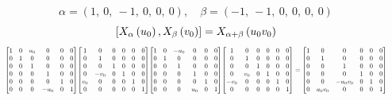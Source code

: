 \documentclass[11pt]{article}
\theoremstyle{definition}
\begin{document}
\[
\alpha = \left( 1, \  0, \  -1, \  0, \  0, \  0\right), \quad \beta = \left( -1, \  -1, \  0, \  0, \  0, \  0\right)
\]
\[
\scaletoalign{\textwidth}{\left[ X_{\alpha}\left(u_{0}\right), X_{\beta}\left(v_{0}\right) \right] = X_{\alpha + \beta}\left(u_{0} v_{0}\right)}
\]
\[
\scaletoalign{\textwidth}{{\left[\begin{matrix}1 & 0 & u_{0} & 0 & 0 & 0\\0 & 1 & 0 & 0 & 0 & 0\\0 & 0 & 1 & 0 & 0 & 0\\0 & 0 & 0 & 1 & 0 & 0\\0 & 0 & 0 & 0 & 1 & 0\\0 & 0 & 0 & - u_{0} & 0 & 1\end{matrix}\right]} {\left[\begin{matrix}1 & 0 & 0 & 0 & 0 & 0\\0 & 1 & 0 & 0 & 0 & 0\\0 & 0 & 1 & 0 & 0 & 0\\0 & - v_{0} & 0 & 1 & 0 & 0\\v_{0} & 0 & 0 & 0 & 1 & 0\\0 & 0 & 0 & 0 & 0 & 1\end{matrix}\right]} {\left[\begin{matrix}1 & 0 & - u_{0} & 0 & 0 & 0\\0 & 1 & 0 & 0 & 0 & 0\\0 & 0 & 1 & 0 & 0 & 0\\0 & 0 & 0 & 1 & 0 & 0\\0 & 0 & 0 & 0 & 1 & 0\\0 & 0 & 0 & u_{0} & 0 & 1\end{matrix}\right]} {\left[\begin{matrix}1 & 0 & 0 & 0 & 0 & 0\\0 & 1 & 0 & 0 & 0 & 0\\0 & 0 & 1 & 0 & 0 & 0\\0 & v_{0} & 0 & 1 & 0 & 0\\- v_{0} & 0 & 0 & 0 & 1 & 0\\0 & 0 & 0 & 0 & 0 & 1\end{matrix}\right]} = {\left[\begin{matrix}1 & 0 & 0 & 0 & 0 & 0\\0 & 1 & 0 & 0 & 0 & 0\\0 & 0 & 1 & 0 & 0 & 0\\0 & 0 & 0 & 1 & 0 & 0\\0 & 0 & - u_{0} v_{0} & 0 & 1 & 0\\0 & u_{0} v_{0} & 0 & 0 & 0 & 1\end{matrix}\right]}}
\]
\end{document}
